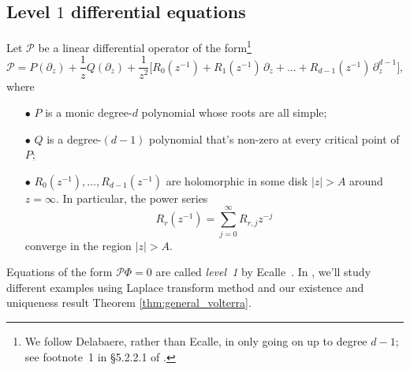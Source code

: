 \documentclass{article}
\theoremstyle{plain}
\begin{document}
\subsection{Level $1$ differential equations}\label{sec:level 1 ODE}
Let $\mathcal{P}$ be a linear differential operator of the form\footnote{ We follow Delabaere, rather than Ecalle, in only going on up to degree $d-1$; see footnote~1 in \S 5.2.2.1 of \cite{diverg-resurg-iii}.}
\[ \mathcal{P} = P(\partial_z) + \frac{1}{z} Q(\partial_z) + \frac{1}{z^2}\big[ R_0(z^{-1}) + R_1(z^{-1})\,\partial_z + \ldots + R_{d-1}(z^{-1})\,\partial_z^{d-1} \big], \]
where
\begin{enumerate}
\item[$\bullet$] $P$ is a monic degree-$d$ polynomial whose roots are all simple; 
\item[$\bullet$] $Q$ is a degree-$(d-1)$ polynomial that's non-zero at every critical point of $P$;
\item[$\bullet$] $R_0(z^{-1}), \ldots, R_{d-1}(z^{-1})$ are holomorphic in some disk $|z| > A$ around $z = \infty$. In particular, the power series
\[ R_r(z^{-1}) = \sum_{j=0}^\infty R_{r,j} z^{-j} \]
converge in the region $|z| > A$.
\end{enumerate}
Equations of the form $\mathcal{P}\Phi = 0$ are called {\em level~1} by Ecalle~\cite[Section 2.1]{EcalleIII}. In \cite{borel_reg}, we'll study different examples using Laplace transform method and our existence and uniqueness result Theorem \ref{thm:general_volterra}. 
\end{document}
